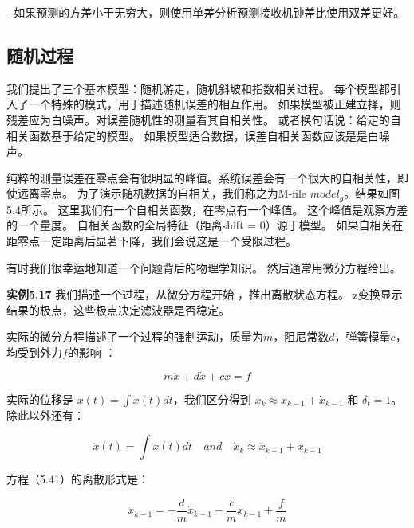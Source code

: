        - 如果预测的方差小于无穷大，则使用单差分析预测接收机钟差比使用双差更好。
       
        \subsection{ 随机过程}
        
          我们提出了三个基本模型：随机游走，随机斜坡和指数相关过程。 每个模型都引入了一个特殊的模式，用于描述随机误差的相互作用。 如果模型被正建立择，则残差应为白噪声。对误差随机性的测量看其自相关性。 或者换句话说：给定的自相关函数基于给定的模型。 如果模型适合数据，误差自相关函数应该是是白噪声。
        
        
        纯粹的测量误差在零点会有很明显的峰值。系统误差会有一个很大的自相关性，即使远离零点。 为了演示随机数据的自相关，我们称之为M-file $ model_g $。结果如图5.4所示。 这里我们有一个自相关函数，在零点有一个峰值。 这个峰值是观察方差的一个量度。 自相关函数的全局特征（距离shift = 0）源于模型。 如果自相关在距零点一定距离后显著下降，我们会说这是一个受限过程。
        
        有时我们很幸运地知道一个问题背后的物理学知识。 然后通常用微分方程给出。
        
        \textbf{实例5.17} 我们描述一个过程，从微分方程开始 ，推出离散状态方程。 z变换显示结果的极点，这些极点决定滤波器是否稳定。
        
        实际的微分方程描述了一个过程的强制运动，质量为$ m $，阻尼常数$ d $，弹簧模量$ c $，均受到外力$ f $的影响 ：
        
         \begin{equation}\label{5.41}
        m \ddot x + d \dot{x} +cx = f
        \end{equation}
        
        
        实际的位移是 $ x(t)=\int \ddot{x}(t)dt  $，我们区分得到 $ x_{k}\approx x_{k-1}+\dot{x}_{k-1} $  和  $ \delta_{t}=1 $。除此以外还有：
        
         \begin{equation}\label{5.42}
         \dot{x}(t)=\int \ddot{x} (t)dt \quad and \quad \dot{x}_{k}\approx\dot{x}_{k-1}+\ddot{x}_{k-1}
         \end{equation}
         
         方程（5.41）的离散形式是：
         
          \begin{equation}\label{5.43}
         \ddot{x}_{k-1}=- \frac{d}{m}\dot{x}_{k-1}-\frac{c}{m}x_{k-1}+\frac{f}{m}
         \end{equation}
         
